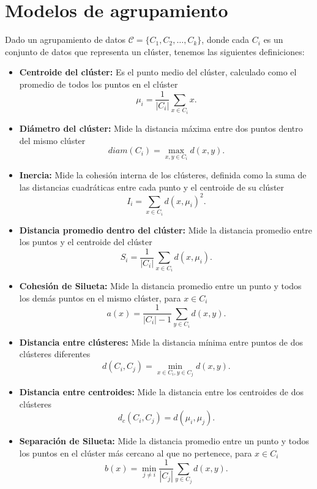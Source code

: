 \documentclass[a4,11pt]{aleph-notas}
\begin{document}
\section{Modelos de agrupamiento}

Dado un agrupamiento de datos $\mathcal{C} = \{C_1, C_2, \ldots, C_k\}$, donde cada $C_i$ es un conjunto de datos que representa un clúster, tenemos las siguientes definiciones:
\begin{itemize}
    \item \textbf{Centroide del clúster:} Es el punto medio del clúster, calculado como el promedio de todos los puntos en el clúster
    \[
    \mu_i = \frac{1}{|C_i|} \sum_{x \in C_i} x.
    \]
    \item \textbf{Diámetro del clúster:} Mide la distancia máxima entre dos puntos dentro del mismo clúster
    \[
    diam(C_i) = \max_{x,y \in C_i} d(x,y).
    \]
    \item \textbf{Inercia:} Mide la cohesión interna de los clústeres, definida como la suma de las distancias cuadráticas entre cada punto y el centroide de su clúster
    \[
    I_i = \sum_{x \in C_i} d(x, \mu_i)^2.
    \] 
    \item \textbf{Distancia promedio dentro del clúster:} Mide la distancia promedio entre los puntos y el centroide del clúster
    \[
    S_i = \frac{1}{|C_i|} \sum_{x \in C_i} d(x, \mu_i).
    \]
    \item \textbf{Cohesión de Silueta:} Mide la distancia promedio entre un punto y todos los demás puntos en el mismo clúster, para $x \in C_i$
    \[
        a(x) = \frac{1}{|C_i| - 1} \sum_{y \in C_i} d(x, y).
    \]
    \item \textbf{Distancia entre clústeres:} Mide la distancia mínima entre puntos de dos clústeres diferentes
    \[
    d(C_i, C_j) = \min_{x \in C_i, y \in C_j} d(x,y).
    \]
    \item \textbf{Distancia entre centroides:} Mide la distancia entre los centroides de dos clústeres
    \[
    d_c(C_i, C_j)= d(\mu_i, \mu_j).
    \]
    \item \textbf{Separación de Silueta:} Mide la distancia promedio entre un punto y todos los puntos en el clúster más cercano al que no pertenece, para $x\in C_i$
    \[
        b(x) = \min_{j \neq i} \frac{1}{|C_j|} \sum_{y\in C_j} d(x, y).
    \]
\end{itemize}
\end{document}
